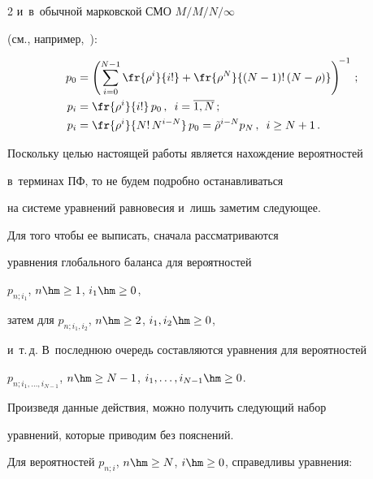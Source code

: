 \begin{multicols}{2}
и~в~обычной марковской СМО $M/M/N/\infty$


(см., например,~\cite{rior}):


\begin{align}




p_{0} &= \left( \sum\limits_{i=0}^{N-1} \fr{\rho^i}{i!}


+ \fr{\rho^N }{(N-1)!\, (N-\rho)}


\right)^{\!-1}\, ;\notag


\\




p_{i} &= \fr{\rho^i}{i!}\, p_{0}\,, \enskip i=\overline{1,N}\,;\notag


\\


\label{3-3}


p_{i} &= \fr{\rho^i}{N!\, N^{i-N}}\, p_{0}


= \tilde{\rho}^{i-N} p_{N}\,, \enskip i\ge N+1\,.


\end{align}





Поскольку целью настоящей работы является нахождение вероятностей


в~терминах ПФ, то не будем подробно останавливаться


на системе уравнений равновесия и~лишь заметим следующее.


Для того чтобы ее выписать, сначала рассматриваются


 уравнения глобального баланса для вероятностей


$p_{n;i_1}$, $n\hm\ge 1$, $i_1 \hm\ge 0$,


затем для $p_{n;i_1,i_2}$, $n\hm\ge2$, $i_1,i_2 \hm\ge 0$,


и~т.\,д. В~последнюю очередь составляются уравнения для вероятностей


$p_{n;i_1,\ldots,i_{N-1}}$, $n\hm\ge N-1$, $i_1,\ldots,i_{N-1} \hm\ge 0$.


Произведя данные действия, можно получить следующий набор


уравнений, которые приводим без пояснений.





Для вероятностей $p_{n;i}$, $n\hm\ge N$, $i\hm \ge 0$, справедливы уравнения:


\begin{align}



\end{align}
\end{multicols}
